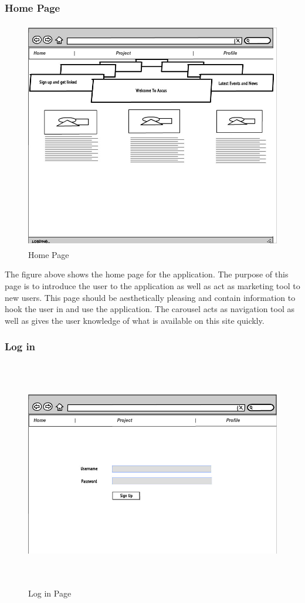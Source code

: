\documentclass[a4paper,oneside,11pt]{report}
\begin{document}
\subsubsection{Home Page}
\begin{figure}[!ht]
\centering
\includegraphics[width=\textwidth,height=10cm]{Homepage.jpg}
\caption{Home Page}
\end{figure}

The figure above shows the home page for the application. The purpose of this page is to introduce the user to the application as well as act as marketing tool to new users. This page should be aesthetically pleasing and contain information to hook the user in and use the application. The carousel acts as navigation tool as well as gives the user knowledge of what is available on this site quickly.
\pagebreak

\subsubsection{Log in}
\begin{figure}[!ht]
\centering
\includegraphics[width=\textwidth,height=10cm]{Log_in.jpg}
\caption{Log in Page}
\end{figure}
\end{document}
